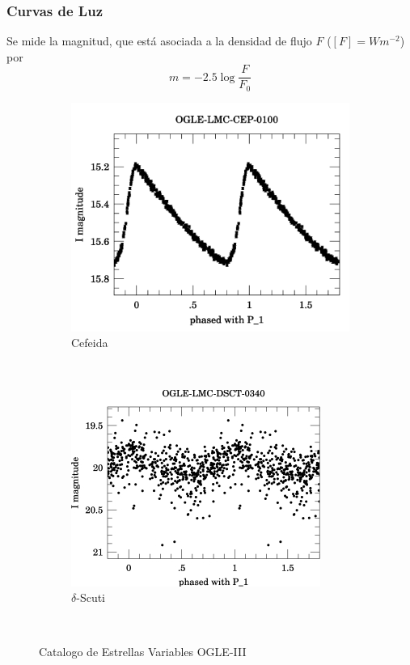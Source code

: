 \documentclass{beamer}
\begin{document}
\begin{frame}
  \frametitle{Curvas de Luz}
  Se mide la magnitud, que está asociada a la densidad de flujo $F$ ($[F] = Wm^{-2}$) por 
  \begin{equation}
    m = -2.5\log \frac{F}{F_0}
  \end{equation} 
  \begin{figure}
    \centering
    \begin{subfigure}[b]{0.4\textwidth}
      \includegraphics[width=\textwidth]{./img/OGLE-LMC-CEP-0100_1.png}
      \caption{Cefeida}
    \end{subfigure}%
    ~ %
    \begin{subfigure}[b]{0.4\textwidth}
      \includegraphics[width=\textwidth]{./img/OGLE-LMC-DSCT-0340_1.jpg}
      \caption{$\delta$-Scuti}
    \end{subfigure}
    ~ %
    \caption{Catalogo de Estrellas Variables OGLE-III}
  \end{figure}
\end{frame}
\end{document}
